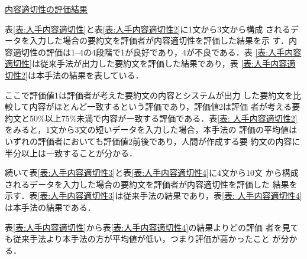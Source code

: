 \documentclass[japanese]{jnlp_1.4}
\begin{document}
\vspace{1\baselineskip}
\noindent\ul{内容適切性の評価結果}

表\ref{表:人手内容適切性}と表\ref{表:人手内容適切性2}に1文から3文から構成
されるデータを入力した場合の要約文を評価者が内容適切性を評価した結果を示
す．内容適切性の評価は1--4の4段階で1が良好であり，4が不良である．表
\ref{表:人手内容適切性}は従来手法が出力した要約文を評価した結果であり，表
\ref{表:人手内容適切性2}は本手法の結果を表している．

\setlength{\tabcolsep}{0.5zw}
\begin{table}[b]
\begin{minipage}{200pt}
\label{表:人手内容適切性}

\end{minipage}
\hfill
\begin{minipage}{200pt}
 \label{表:人手内容適切性2}

\end{minipage}
\end{table}

\noindent
ここで評価値1は評価者が考えた要約文の内容とシステムが出力
した要約文を比較して内容がほとんど一致するという評価であり，評価値2は評価
者が考える要約文と50\%以上75\%未満で内容が一致する評価である．表\ref{表:
人手内容適切性2}をみると，1文から3文の短いデータを入力した場合，本手法の
評価の平均値はいずれの評価者においても評価値2前後であり，人間が作成する要
約文の内容に半分以上は一致することが分かる．

続いて表\ref{表:人手内容適切性3}と表\ref{表:人手内容適切性4}に4文から10文
から構成されるデータを入力した場合の要約文を評価者が内容適切性を評価した
結果を示す．表\ref{表:人手内容適切性3}は従来手法の結果であり，表\ref{表:
人手内容適切性4}は本手法の結果である．

\begin{table}[b]
\begin{minipage}{200pt}
\label{表:人手内容適切性3}

\end{minipage}
\hfill
\begin{minipage}{200pt}
 \label{表:人手内容適切性4}

\end{minipage}
\end{table}

表\ref{表:人手内容適切性}から表\ref{表:人手内容適切性4}の結果よりどの評価
者を見ても従来手法より本手法の方が平均値が低い，つまり評価が高かったこと
が分かる．
\end{document}
